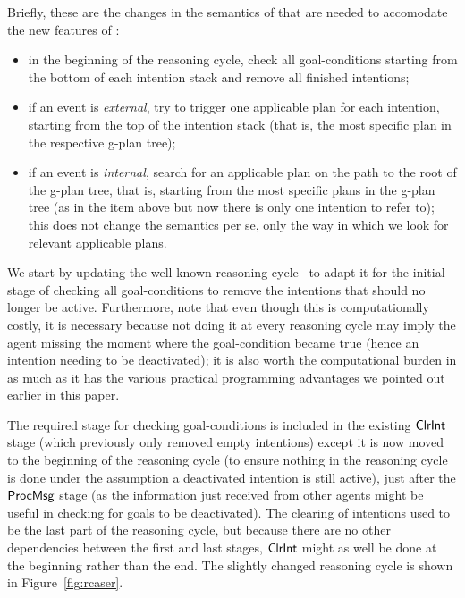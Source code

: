 
Briefly, these are the changes in the semantics of \asl
that are needed to accomodate the new features of \aser:

\begin{itemize}
\item in the beginning of the reasoning cycle, check all
  goal-conditions starting from the bottom of each intention stack and
  remove all finished intentions;

\item if an event is \emph{external}, try to trigger one
  applicable plan for each intention, starting from the
  top of the intention stack (that is, the most specific plan in the
  respective g-plan tree);

\item if an event is \emph{internal}, search for an applicable plan on
  the path to the root of the g-plan tree, that is, starting from the
  most specific plans in the g-plan tree (as in the item above but now
  there is only one intention to refer to); this does not change the
  semantics per se, only the way in which we look for relevant
  applicable plans.
\end{itemize}

We start by updating the well-known reasoning cycle~\cite{bordini:07}
to adapt it for the initial stage of checking all goal-conditions to
remove the intentions that should no longer be active. Furthermore,
note that even though this is computationally costly, it is necessary
because not doing it at every reasoning cycle may imply the agent
missing the moment where the goal-condition became true (hence an
intention needing to be deactivated); it is also worth the
computational burden in as much as it has the various practical
programming advantages we pointed out earlier in this paper.


The required stage for checking goal-conditions is included in the
existing $\mathsf{ClrInt}$ stage (which previously only removed empty
intentions) except it is now moved to the beginning of the reasoning
cycle (to ensure nothing in the reasoning cycle is done under the
assumption a deactivated intention is still active), just after the
$\mathsf{ProcMsg}$ stage (as the information just received from other agents
might be useful in checking for goals to be deactivated). The clearing of
intentions used to be the last part of the reasoning cycle, but
because there are no other dependencies between the first and last
stages, $\mathsf{ClrInt}$ might as well be done at the beginning rather than
the end. The slightly changed reasoning cycle is shown in
Figure~\ref{fig:rcaser}.

